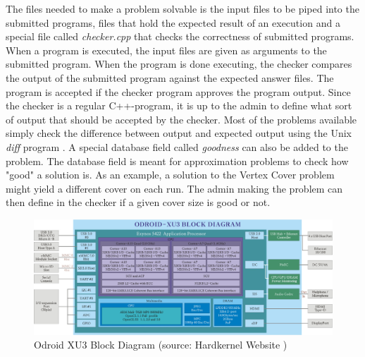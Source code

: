 The files needed to make a problem solvable is the input files to be piped into the submitted programs, files that hold the expected result of an execution and a special file called \textit{checker.cpp} that checks the correctness of submitted programs. When a program is executed, the input files are given as arguments to the submitted program. When the program is done executing, the checker compares the output of the submitted program against the expected answer files. The program is accepted if the checker program approves the program output. Since the checker is a regular C++-program, it is up to the admin to define what sort of output that should be accepted by the checker. Most of the problems available simply check the difference between output and expected output using the Unix \textit{diff} program \cite{DIFF}. A special database field called \textit{goodness} can also be added to the problem. The database field is meant for approximation problems to check how "good" a solution is. As an example, a solution to the Vertex Cover problem might yield a different cover on each run. The admin making the problem can then define in the checker if a given cover size is good or not.

\begin{figure}
    \includegraphics[width=1.0\textwidth]{figs/block-xu3.jpg}
    \caption[Odroid XU3 Block Diagram]{Odroid XU3 Block Diagram (source: Hardkernel Website \cite{XU3-BLOCK})}
    \label{fig:odroid-block}
\end{figure}

